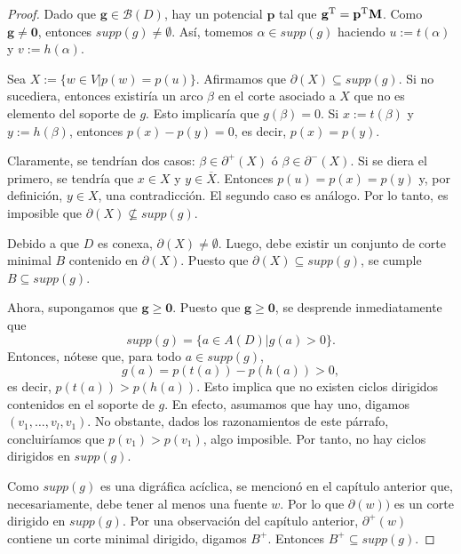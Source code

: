 \begin{proof}
Dado que $\mathbf{g} \in \mathcal{B}(D)$, hay un potencial $\mathbf{p}$ tal que $\mathbf{g}^{\textnormal{T}} = \mathbf{p}^{\textnormal{T}}\textbf{M}$. Como $\mathbf{g} \neq \mathbf{0}$, entonces $supp(g) \neq \emptyset$. Así, tomemos $\alpha \in supp(g)$ haciendo $u:=t(\alpha)$ y $v:=h(\alpha)$.

Sea $X:=\{w \in V | p(w) = p(u)\}$. Afirmamos que $\partial(X) \subseteq supp(g)$. Si no sucediera, entonces existiría un arco $\beta$ en el corte asociado a $X$ que no es elemento del soporte de $g$. Esto implicaría que $g(\beta) = 0$. Si $x:=t(\beta)$ y $y:=h(\beta)$, entonces $p(x) - p(y) = 0$, es decir, $p(x) = p(y)$.

Claramente, se tendrían dos casos: $\beta \in \partial^{+}(X)$ ó $\beta \in \partial^{-}(X)$. Si se diera el primero, se tendría que $x \in X$ y $y \in \overline{X}$. Entonces $p(u) = p(x) = p(y)$ y, por definición, $ y \in X$, una contradicción. El segundo caso es análogo. Por lo tanto, es imposible que $\partial(X)\nsubseteq supp(g)$.

Debido a que $D$ es conexa, $\partial(X) \neq \emptyset$. Luego, debe existir un conjunto de corte minimal $B$ contenido en $\partial(X)$. Puesto que $\partial(X) \subseteq supp(g)$, se cumple $B \subseteq supp(g)$.

Ahora, supongamos que $\mathbf{g} \geq \mathbf{0}$. Puesto que $\mathbf{g} \geq \mathbf{0}$, se desprende inmediatamente que $$supp(g) = \{a \in A(D) | g(a)>0 \}.$$ Entonces, nótese que, para todo $a\in supp(g)$, $$g(a) = p(t(a)) - p(h(a)) > 0,$$ es decir, $p(t(a))>p(h(a))$. Esto implica que no existen ciclos dirigidos contenidos en el soporte de $g$. En efecto, asumamos que hay uno, digamos $(v_{1},\ldots,v_{l},v_{1})$. No obstante, dados los razonamientos de este párrafo, concluiríamos que $p(v_{1}) > p(v_{1})$, algo imposible. Por tanto, no hay ciclos dirigidos en $supp(g)$.

Como $supp(g)$ es una digráfica acíclica, se mencionó en el capítulo anterior que, necesariamente, debe tener al menos una fuente $w$. Por lo que $\partial(w))$ es un corte dirigido en $supp(g)$. Por una observación del capítulo anterior, $\partial^{+}(w)$ contiene un corte minimal dirigido, digamos $B^{+}$. Entonces $B^{+} \subseteq supp(g)$. 

\end{proof}

